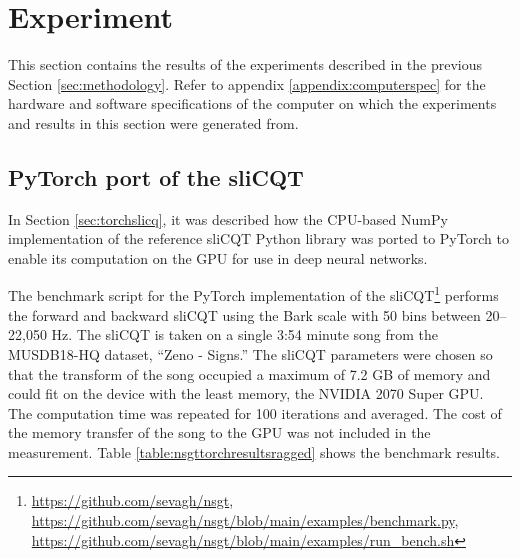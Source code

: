 \documentclass[report.tex]{subfiles}
\begin{document}
\section{Experiment}
\label{sec:experiment}

This section contains the results of the experiments described in the previous Section \ref{sec:methodology}. Refer to appendix \ref{appendix:computerspec} for the hardware and software specifications of the computer on which the experiments and results in this section were generated from.

\subsection{PyTorch port of the sliCQT}
\label{sec:gpuexperimentpytorch}

In Section \ref{sec:torchslicq}, it was described how the CPU-based NumPy implementation of the reference sliCQT Python library was ported to PyTorch to enable its computation on the GPU for use in deep neural networks.

The benchmark script for the PyTorch implementation of the sliCQT\footnote{\url{https://github.com/sevagh/nsgt}, \url{https://github.com/sevagh/nsgt/blob/main/examples/benchmark.py}, \url{https://github.com/sevagh/nsgt/blob/main/examples/run_bench.sh}} performs the forward and backward sliCQT using the Bark scale with 50 bins between 20--22,050 Hz. The sliCQT is taken on a single 3:54 minute song from the MUSDB18-HQ dataset, ``Zeno - Signs.'' The sliCQT parameters were chosen so that the transform of the song occupied a maximum of 7.2 GB of memory and could fit on the device with the least memory, the NVIDIA 2070 Super GPU. The computation time was repeated for 100 iterations and averaged. The cost of the memory transfer of the song to the GPU was not included in the measurement. Table \ref{table:nsgttorchresultsragged} shows the benchmark results.
\end{document}
